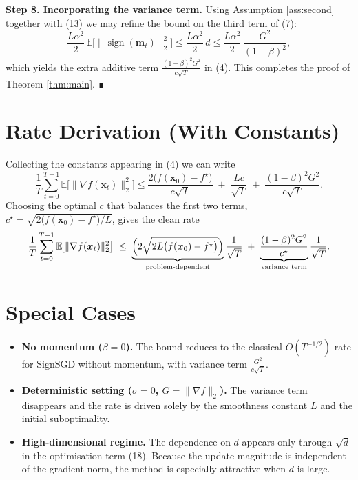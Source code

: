 \documentclass{article}
\newcommand{\sign}{\operatorname{sign}}
\newcommand{\E}{\mathbb{E}}
\begin{document}
\noindent\textbf{Step 8. Incorporating the variance term.}
Using Assumption \ref{ass:second} together with (13) we may refine the bound on the third term of (7):
\[
\frac{L\alpha^{2}}{2}\,\E\!\big[\|\sign(\bm{m}_{t})\|_{2}^{2}\big]
\le \frac{L\alpha^{2}}{2}\,d
\le \frac{L\alpha^{2}}{2}\,\frac{G^{2}}{(1-\beta)^{2}},
\]
which yields the extra additive term
$\displaystyle \frac{(1-\beta)^{2}G^{2}}{c\sqrt{T}}$ in (4).  This completes the proof of Theorem \ref{thm:main}. ∎

\section*{Rate Derivation (With Constants)}
Collecting the constants appearing in (4) we can write
\[
\boxed{
\frac{1}{T}\sum_{t=0}^{T-1}\E\!\big[\|\nabla f(\bm{x}_{t})\|_{2}^{2}\big]
\le
\frac{2\big(f(\bm{x}_{0})-f^{\star}\big)}{c\sqrt{T}}
\;+\;
\frac{L c}{\sqrt{T}}
\;+\;
\frac{(1-\beta)^{2}G^{2}}{c\sqrt{T}}
}.
\]
Choosing the optimal $c$ that balances the first two terms,
$c^{\star}= \sqrt{2\big(f(\bm{x}_{0})-f^{\star}\big)/L}$,
gives the clean rate
\[
\frac{1}{T}\sum_{t=0}^{T-1}\E\!\big[\|\nabla f(\bm{x}_{t})\|_{2}^{2}\big]
\;\le\;
\underbrace{\Bigl(2\sqrt{2L\big(f(\bm{x}_{0})-f^{\star}\big)}\Bigr)}_{\text{problem‑dependent}}
\frac{1}{\sqrt{T}}
\;+\;
\underbrace{\frac{(1-\beta)^{2}G^{2}}{c^{\star}}}_{\text{variance term}}\frac{1}{\sqrt{T}} .
\]

\section*{Special Cases}
\begin{itemize}
\item \textbf{No momentum ($\beta=0$).}  The bound reduces to the classical
      $O(T^{-1/2})$ rate for SignSGD without momentum, with variance term
      $\frac{G^{2}}{c\sqrt{T}}$.
\item \textbf{Deterministic setting ($\sigma=0$, $G=\|\nabla f\|_{2}$).}
      The variance term disappears and the rate is driven solely by the
      smoothness constant $L$ and the initial suboptimality.
\item \textbf{High‑dimensional regime.}
      The dependence on $d$ appears only through $\sqrt{d}$ in the
      optimisation term (18).  Because the update magnitude is independent
      of the gradient norm, the method is especially attractive when $d$
      is large.
\end{itemize}
\end{document}

